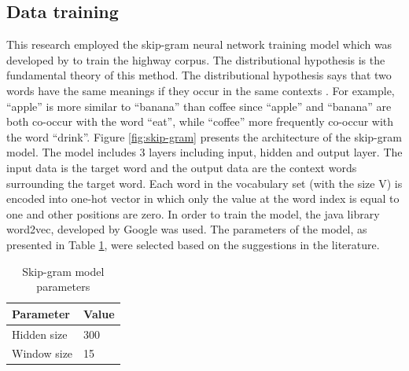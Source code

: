 \documentclass[NewProceedings, InsideFigs]{ascelike} %
\begin{document}
\subsection{Data training}
This research employed the skip-gram neural network training model which was developed by \cite{Mikolov13a} to train the highway corpus.  The distributional hypothesis is the fundamental theory of this method. The distributional hypothesis says that two words have the same meanings if they occur in the same contexts \cite{harispe15}. For example, ``apple'' is more similar to ``banana''  than coffee since ``apple'' and ``banana'' are both co-occur with the word ``eat'', while ``coffee'' more frequently co-occur with the word ``drink''. Figure \ref{fig:skip-gram} presents the architecture of the skip-gram model. The model includes 3 layers including input, hidden and output layer. The input data is the target word and the output data are the context words surrounding the target word. Each word in the vocabulary set (with the size V) is encoded into one-hot vector in which only the value at the word index is equal to one and other positions are zero. In order to train the model, the java library word2vec, developed by Google was used. The parameters of the model, as presented in Table \ref{table:nn-parameters}, were selected based on the suggestions in the literature.
%


\begin{table} [t]
\caption{Skip-gram model parameters}
\label{table:nn-parameters}
\centering
\small
\renewcommand{\arraystretch}{1.25}
\begin{tabular}{l l}
\hline
\textbf{Parameter} & \textbf{Value}\\

\hline
Hidden size		&	300\\
Window size	&	15\\

\hline
\end{tabular}
\normalsize
\end{table}
\end{document}

